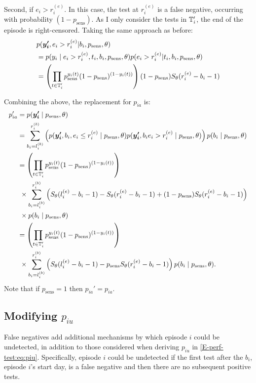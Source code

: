 \documentclass[thesis.tex]{subfiles}
\begin{document}
Second, if $e_i > r_i^{(e)}$.
In this case, the test at $r_i^{(e)}$ is a false negative, occurring with probability $(1 - p_\text{sens})$.
As I only consider the tests in $\mathbb{T}_i'$, the end of the episode is right-censored.
Taking the same approach as before:
\begin{align}
&p(\bm{y_i'}, e_i > r_i^{(e)} | b_i, p_\text{sens}, \theta) \\
&= p(y_i \mid e_i > r_i^{(e)}, t_i, b_i, p_\text{sens}, \theta) p(e_i > r_i^{(e)} | t_i, b_i, p_\text{sens}, \theta) \\
&= \left( \prod_{t \in \mathbb{T}'_i} p_\text{sens}^{y_i(t)} (1 - p_\text{sens})^{(1 - y_i(t))} \right) (1 - p_\text{sens}) S_\theta(r_i^{(e)} - b_i - 1)
\end{align}

Combining the above, the replacement for $p_{ia}$ is:
\begin{align}
p_{ia}'
&= p(\bm{y_i'} \mid p_\text{sens}, \theta) \\
&= \sum_{b_i = l_i^{(b)}}^{r_i^{(b)}} \left( p(\bm{y_i'}, b_i, e_i \leq r_i^{(e)} \mid p_\text{sens}, \theta) p(\bm{y_i'}, b_i e_i > r_i^{(e)} \mid p_\text{sens}, \theta) \right) p(b_i \mid p_\text{sens}, \theta) \\
&= \left( \prod_{t \in \mathbb{T}'_i} p_\text{sens}^{y_i(t)} (1 - p_\text{sens})^{(1 - y_i(t))} \right) \\ & \ \times \sum_{b_i = l_i^{(b)}}^{r_i^{(b)}} \left( S_\theta(l_i^{(e)} - b_i - 1) - S_\theta(r_i^{(e)} - b_i - 1) + (1 - p_\text{sens}) S_\theta(r_i^{(e)} - b_i - 1) \right) \\ & \ \times p(b_i \mid p_\text{sens}, \theta) \\
&= \left( \prod_{t \in \mathbb{T}'_i} p_\text{sens}^{y_i(t)} (1 - p_\text{sens})^{(1 - y_i(t))} \right) \\ & \ \times \sum_{b_i = l_i^{(b)}}^{r_i^{(b)}} \left( S_\theta(l_i^{(e)} - b_i - 1) - p_\text{sens} S_\theta(r_i^{(e)} - b_i - 1) \right) p(b_i \mid p_\text{sens}, \theta).
\label{imperf-test:eq:pia-prime}
\end{align}
Note that if $p_\text{sens} = 1$ then $p_{ia}' = p_{ia}$.

\subsection{Modifying \texorpdfstring{$p_{iu}$}{piu}} \label{imperf-test:sec:modifying-p_iu}

False negatives add additional mechanisms by which episode $i$ could be undetected, in addition to those considered when deriving $p_{iu}$ in \cref{E-perf-test:eq:piu}.
Specifically, episode $i$ could be undetected if the first test after the $b_i$, episode $i$'s start day, is a false negative and then there are no subsequent positive tests.
\end{document}
